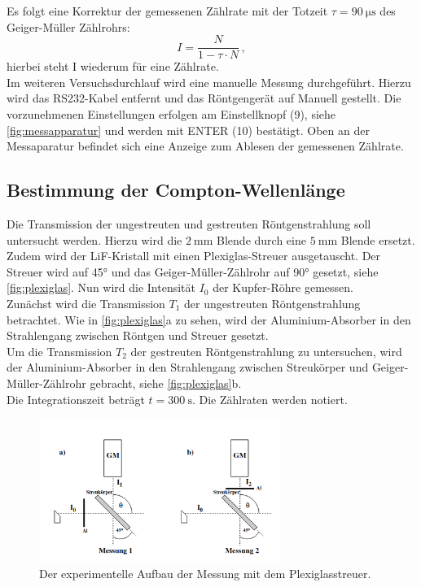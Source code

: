 \noindent Es folgt eine Korrektur der gemessenen Zählrate mit der Totzeit $\tau = \SI{90}{\micro\second}$ des Geiger-Müller Zählrohrs:
\begin{equation}\label{eqn:korrektur}
    I = \frac{N}{1 - \tau \cdot N} \, ,
\end{equation}
hierbei steht I wiederum für eine Zählrate.\\

\noindent
Im weiteren Versuchsdurchlauf wird eine manuelle Messung durchgeführt.
Hierzu wird das RS232-Kabel entfernt und das Röntgengerät auf Manuell gestellt.
Die vorzunehmenen Einstellungen erfolgen am Einstellknopf (9), siehe \autoref{fig:messapparatur} und werden mit ENTER (10) bestätigt.
Oben an der Messaparatur befindet sich eine Anzeige zum Ablesen der gemessenen Zählrate.

\subsection{Bestimmung der Compton-Wellenlänge}
Die Transmission der ungestreuten und gestreuten Röntgenstrahlung soll untersucht werden.
Hierzu wird die $\SI{2}{\milli\metre}$ Blende durch eine $\SI{5}{\milli\metre}$ Blende ersetzt.
Zudem wird der LiF-Kristall mit einen Plexiglas-Streuer ausgetauscht.
Der Streuer wird auf 45° und das Geiger-Müller-Zählrohr auf 90° gesetzt, siehe \autoref{fig:plexiglas}.
Nun wird die Intensität $I_0$ der Kupfer-Röhre gemessen. \\
\noindent
Zunächst wird die Transmission $T_1$ der ungestreuten Röntgenstrahlung betrachtet.
Wie in \autoref{fig:plexiglas}a zu sehen, wird der Aluminium-Absorber in den Strahlengang zwischen Röntgen und Streuer gesetzt. \\
\noindent
Um die Transmission $T_2$ der gestreuten Röntgenstrahlung zu untersuchen, wird der Aluminium-Absorber in den Strahlengang zwischen Streukörper und Geiger-Müller-Zählrohr gebracht,
siehe \autoref{fig:plexiglas}b. \\
Die Integrationszeit beträgt $t = \SI{300}{\second}$.
Die Zählraten werden notiert.

\begin{figure}
    \centering
    \includegraphics[width=0.7\textwidth]{bilder/plexiglas_aufbau.png}
    \caption{Der experimentelle Aufbau der Messung mit dem Plexiglasstreuer. \cite{anleitung} }
    \label{fig:plexiglas}
\end{figure}